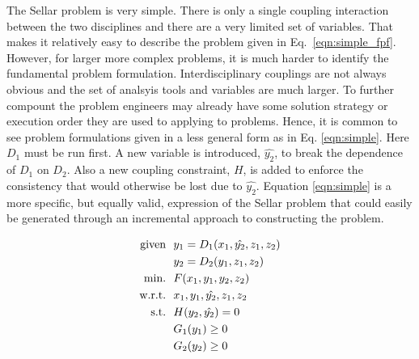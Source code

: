     The Sellar problem is very simple. There is only a single coupling interaction 
    between the two disciplines and there are a very limited set of variables. 
    That makes it relatively easy to describe the problem given in 
    Eq.~\ref{eqn:simple_fpf}. However, for larger more complex problems, 
    it is much harder to identify the fundamental problem formulation. Interdisciplinary 
    couplings are not always obvious and the set of analsyis tools and variables are 
    much larger. To further compount the problem engineers may already have some 
    solution strategy or execution order they are used to applying to problems. 
    Hence, it is common to see problem formulations given in a less general form 
    as in Eq. \ref{eqn:simple}. Here $D_1$ must be run 
    first. A new variable is introduced, $\hat{y_2}$, to break the dependence of
    $D_1$ on $D_2$. Also a new coupling constraint, $H$, is added to enforce the 
    consistency that would otherwise be lost due to $\hat{y_2}$. Equation \ref{eqn:simple} is 
    a more specific, but equally valid, expression of the Sellar problem that could easily be 
    generated through an incremental approach to constructing the problem. 

    \begin{align}
        \textrm{given} & \ \ y_1 = D_1(x_1,\hat{y_2},z_1,z_2) \notag
        \\      & \ \ y_2 = D_2(y_1,z_1,z_2) \notag
        \\\textrm{min.} &\ \ F(x_1,y_1,y_2,z_2) \notag
        \\\textrm{w.r.t.} & \ \ x_1,y_1,\hat{y_2},z_1,z_2 \notag
        \\\textrm{s.t.} & \ \ H(y_2,\hat{y_2}) = 0 \notag 
        \\     & \ \ G_1(y_1) \geq 0 \notag
        \\     & \ \ G_2(y_2) \geq 0
        \label{eqn:simple}
    \end{align}


